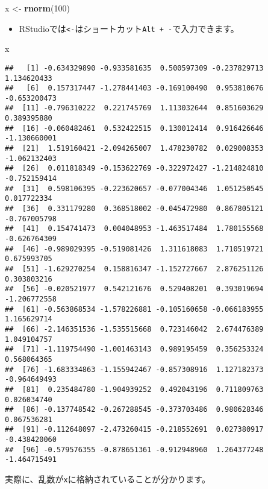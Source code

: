 \documentclass[]{bxjsarticle}
\newenvironment{Shaded}{\begin{snugshade}}{\end{snugshade}}
\newcommand{\DecValTok}[1]{\textcolor[rgb]{0.00,0.00,0.81}{#1}}
\newcommand{\KeywordTok}[1]{\textcolor[rgb]{0.13,0.29,0.53}{\textbf{#1}}}
\newcommand{\NormalTok}[1]{#1}
\newcommand{\StringTok}[1]{\textcolor[rgb]{0.31,0.60,0.02}{#1}}
\providecommand{\tightlist}{%
  \setlength{\itemsep}{0pt}\setlength{\parskip}{0pt}}
\begin{document}
\begin{Shaded}
\begin{Highlighting}[]
\NormalTok{x <-}\StringTok{ }\KeywordTok{rnorm}\NormalTok{(}\DecValTok{100}\NormalTok{)}
\end{Highlighting}
\end{Shaded}

\begin{itemize}
\tightlist
\item
  RStudioでは\texttt{\textless{}-}はショートカット\texttt{Alt\ +\ -}で入力できます。
\end{itemize}

\begin{Shaded}
\begin{Highlighting}[]
\NormalTok{x}
\end{Highlighting}
\end{Shaded}

\begin{verbatim}
##   [1] -0.634329890 -0.933581635  0.500597309 -0.237829713  1.134620433
##   [6]  0.157317447 -1.278441403 -0.169100490  0.953810676 -0.653200473
##  [11] -0.796310222  0.221745769  1.113032644  0.851603629  0.389395880
##  [16] -0.060482461  0.532422515  0.130012414  0.916426646 -1.130660001
##  [21]  1.519160421 -2.094265007  1.478230782  0.029008353 -1.062132403
##  [26]  0.011818349 -0.153622769 -0.322972427 -1.214824810 -0.752159414
##  [31]  0.598106395 -0.223620657 -0.077004346  1.051250545  0.017722334
##  [36]  0.331179280  0.368518002 -0.045472980  0.867805121 -0.767005798
##  [41]  0.154741473  0.004048953 -1.463517484  1.780155568 -0.626764309
##  [46] -0.989029395 -0.519081426  1.311618083  1.710519721  0.675993705
##  [51] -1.629270254  0.158816347 -1.152727667  2.876251126  0.303803216
##  [56] -0.020521977  0.542121676  0.529408201  0.393019694 -1.206772558
##  [61] -0.563868534 -1.578226881 -0.105160658 -0.066183955  1.165629714
##  [66] -2.146351536 -1.535515668  0.723146042  2.674476389  1.049104757
##  [71] -1.119754490 -1.001463143  0.989195459  0.356253324  0.568064365
##  [76] -1.683334863 -1.155942467 -0.857308916  1.127182373 -0.964649493
##  [81]  0.235484780 -1.904939252  0.492043196  0.711809763  0.026034740
##  [86] -0.137748542 -0.267288545 -0.373703486  0.980628346  0.067536281
##  [91] -0.112648097 -2.473260415 -0.218552691  0.027380917 -0.438420060
##  [96] -0.579576355 -0.878651361 -0.912948960  1.264377248 -1.464715491
\end{verbatim}

実際に、乱数が\texttt{x}に格納されていることが分かります。
\end{document}
